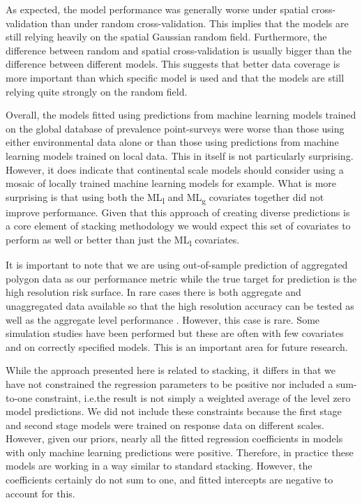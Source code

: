 \documentclass[review]{elsarticle}
\begin{document}
As expected, the model performance was generally worse under spatial cross-validation than under random cross-validation.
This implies that the models are still relying heavily on the spatial Gaussian random field.
Furthermore, the difference between random and spatial cross-validation is usually bigger than the difference between different models.
This suggests that better data coverage is more important than which specific model is used and that the models are still relying quite strongly on the random field.






Overall, the models fitted using predictions from machine learning models trained on the global database of prevalence point-surveys were worse than those using either environmental data alone or than those using predictions from machine learning models trained on local data.
This in itself is not particularly surprising.
However, it does indicate that continental scale models should consider using a mosaic of locally trained machine learning models for example.
What is more surprising is that using both the ML\textsubscript{l} and ML\textsubscript{g} covariates together did not improve performance.
Given that this approach of creating diverse predictions is a core element of stacking methodology we would expect this set of covariates to perform as well or better than just the ML\textsubscript{l} covariates.

It is important to note that we are using out-of-sample prediction of aggregated polygon data as our performance metric while the true target for prediction is the high resolution risk surface.
In rare cases there is both aggregate and unaggregated data available so that the high resolution accuracy can be tested as well as the aggregate level performance \citep{sturrock2014fine}.
However, this case is rare.
Some simulation studies have been performed \citep{wilson2017pointless, law2018variational, johnson2019spatially} but these are often with few covariates and on correctly specified models.
This is an important area for future research.

While the approach presented here is related to stacking, it differs in that we have not constrained the regression parameters to be positive nor included a sum-to-one constraint, i.e.\thinspace the result is not simply a weighted average of the level zero model predictions.
We did not include these constraints because the first stage and second stage models were trained on response data on different scales.
However, given our priors, nearly all the fitted regression coefficients in models with only machine learning predictions were positive.
Therefore, in practice these models are working in a way similar to standard stacking.
However, the coefficients certainly do not sum to one, and fitted intercepts are negative to account for this.
\end{document}
